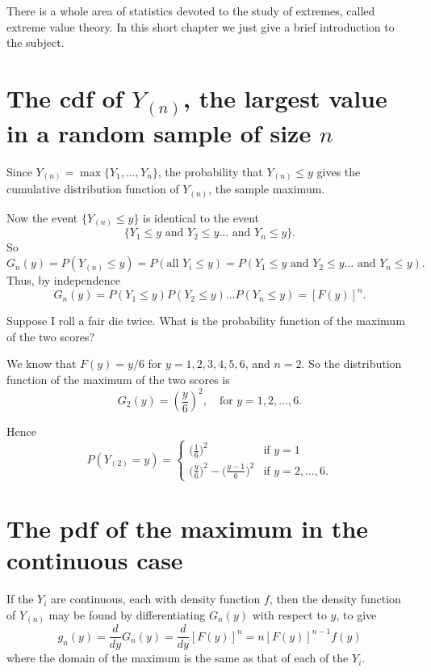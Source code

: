\documentclass[]{book}
\theoremstyle{definition}
\theoremstyle{definition}
\theoremstyle{definition}
\theoremstyle{remark}
\let\BeginKnitrBlock\begin \let\EndKnitrBlock\end
\begin{document}
There is a whole area of statistics devoted to the study of extremes,
called extreme value theory. In this short chapter we just give a brief
introduction to the subject.

\section{\texorpdfstring{The cdf of \(Y_{(n)}\), the largest value in a
random sample of size
\(n\)}{The cdf of Y\_\{(n)\}, the largest value in a random sample of size n}}\label{the-cdf-of-y_n-the-largest-value-in-a-random-sample-of-size-n}

Since \(Y_{(n)} = \max\{Y_1, \ldots, Y_n\}\), the probability that
\(Y_{(n)} \leq y\) gives the cumulative distribution function of
\(Y_{(n)}\), the sample maximum.

Now the event \(\{Y_{(n)} \leq y\}\) is identical to the event
\[\{ Y_1 \leq y \text{ and } Y_2 \leq y \ldots \text{ and } Y_n \leq y\}.\]
So \[G_n(y) = P(Y_{(n)} \leq y) = P(\text{all $Y_i \leq y$})
= P(Y_1 \leq y \text{ and } Y_2 \leq y \ldots \text{ and } Y_n \leq y).\]
Thus, by independence
\[G_n(y) = P(Y_1 \leq y)P(Y_2 \leq y) \ldots P(Y_n \leq y) = [F(y)]^n.\]

\BeginKnitrBlock{example}[Maximum of dice rolls]
\protect\hypertarget{exm:unnamed-chunk-41}{}{\label{exm:unnamed-chunk-41}
\iffalse (Maximum of dice rolls) \fi{} }Suppose I roll a fair die twice.
What is the probability function of the maximum of the two scores?

We know that \(F(y) = y/6\) for \(y= 1, 2, 3, 4, 5, 6\), and \(n = 2\).
So the distribution function of the maximum of the two scores is
\[G_2(y) = \left(\frac{y}{6}\right)^2, \quad
\text{for $y = 1, 2, \ldots, 6$}.\]

Hence \[P(Y_{(2)} = y) = 
\begin{cases} 
\Big(\frac{1}{6}\Big)^2 & \text{if $y = 1$} \\
\Big(\frac{y}{6}\Big)^2 -
\Big(\frac{y - 1}{6}\Big)^2 &
\text{if $y= 2, \ldots, 6$}.
\end{cases}
\]
\EndKnitrBlock{example}

\section{The pdf of the maximum in the continuous
case}\label{the-pdf-of-the-maximum-in-the-continuous-case}

If the \(Y_i\) are continuous, each with density function \(f\), then
the density function of \(Y_{(n)}\) may be found by differentiating
\(G_n(y)\) with respect to \(y\), to give
\[g_n(y) = \frac{d}{dy} G_n(y) = \frac{d}{dy} [F(y)]^n
= n[F(y)]^{n-1} f(y)\] where the domain of the maximum is the same as
that of each of the \(Y_i\).
\end{document}
